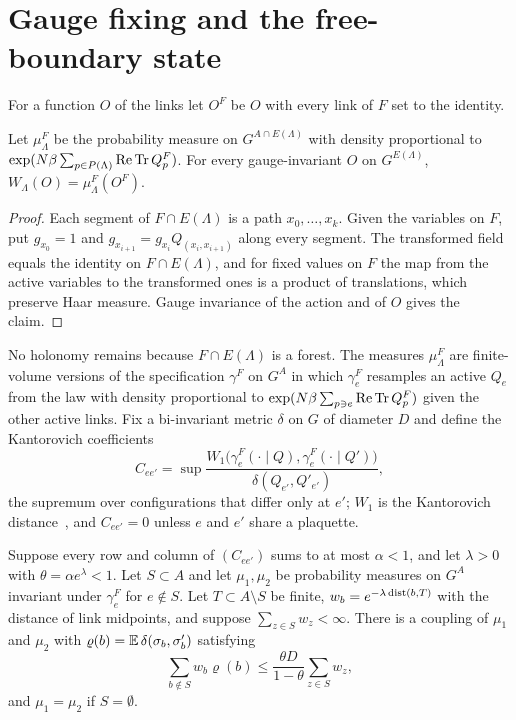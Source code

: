 \section{Gauge fixing and the free-boundary state}\label{sec:state}

For a function $O$ of the links let $O^F$ be $O$ with every link of $F$ set to
the identity.

\begin{lemma}\label{lem:gaugefix}
Let $\mu^F_\Lambda$ be the probability measure on $G^{A\cap E(\Lambda)}$ with
density proportional to $\exp(N\beta\sum_{p\in P(\Lambda)}\operatorname{Re}\operatorname{Tr} Q^F_p)$. For
every gauge-invariant $O$ on $G^{E(\Lambda)}$, $W_\Lambda(O)=\mu^F_\Lambda(O^F)$.
\end{lemma}

\begin{proof}
Each segment of $F\cap E(\Lambda)$ is a path $x_0,\dots,x_k$. Given the
variables on $F$, put $g_{x_0}=1$ and $g_{x_{i+1}}=g_{x_i}Q_{(x_i,x_{i+1})}$
along every segment. The transformed field equals the identity on $F\cap
E(\Lambda)$, and for fixed values on $F$ the map from the active variables to
the transformed ones is a product of translations, which preserve Haar
measure. Gauge invariance of the action and of $O$ gives the claim.
\end{proof}

No holonomy remains because $F\cap E(\Lambda)$ is a forest. The measures
$\mu^F_\Lambda$ are finite-volume versions of the specification $\gamma^F$ on
$G^A$ in which $\gamma^F_e$ resamples an active $Q_e$ from the law with density
proportional to $\exp(N\beta\sum_{p\ni e}\operatorname{Re}\operatorname{Tr} Q^F_p)$ given the other active
links. Fix a bi-invariant metric $\delta$ on $G$ of diameter $D$ and define the
Kantorovich coefficients
\[
C_{ee'}=\sup\frac{W_1\bigl(\gamma^F_e(\cdot\mid Q),\gamma^F_e(\cdot\mid Q')\bigr)}
{\delta(Q_{e'},Q'_{e'})},
\]
the supremum over configurations that differ only at $e'$; $W_1$ is the
Kantorovich distance~\cite{Vil09}, and $C_{ee'}=0$ unless $e$ and $e'$ share a
plaquette.

\begin{lemma}[comparison]\label{lem:comparison}
Suppose every row and column of $(C_{ee'})$ sums to at most $\alpha<1$, and let
$\lambda>0$ with $\theta=\alpha e^\lambda<1$. Let $S\subset A$ and let $\mu_1,\mu_2$
be probability measures on $G^A$ invariant under $\gamma^F_e$ for $e\notin S$.
Let $T\subset A\setminus S$ be finite, $w_b=e^{-\lambda\operatorname{dist}(b,T)}$ with the
distance of link midpoints, and suppose $\sum_{z\in S}w_z<\infty$. There is a
coupling of $\mu_1$ and $\mu_2$ with $\varrho(b)=\mathbb{E}\,\delta(\sigma_b,\sigma'_b)$
satisfying
\[
\sum_{b\notin S}w_b\varrho(b)\le\frac{\theta D}{1-\theta}\sum_{z\in S}w_z ,
\]
and $\mu_1=\mu_2$ if $S=\emptyset$.
\end{lemma}

